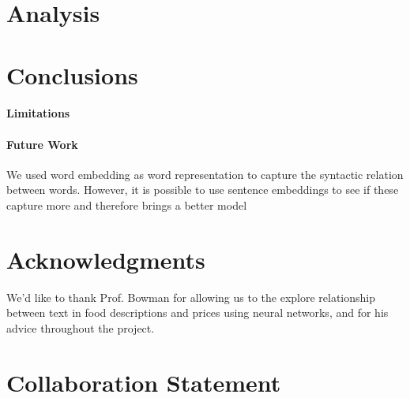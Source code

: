 \documentclass[11pt,letterpaper]{article}
\begin{document}
\section{Analysis}
\section{Conclusions}

\paragraph{Limitations}

\paragraph{Future Work}
We used word embedding as word representation to capture the syntactic relation between words. However, it is possible to use sentence embeddings to see if these capture more and therefore brings a better model \cite{}

\section*{Acknowledgments}
We'd like to thank Prof. Bowman for allowing us to the explore relationship between text in food descriptions and prices using neural networks, and for his advice throughout the project.
\section*{Collaboration Statement}



\end{document}

